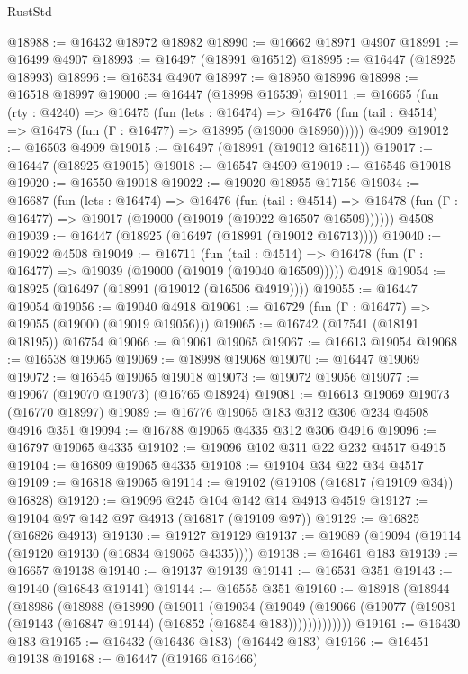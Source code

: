 \begin{lexlean}{RustStd}
\begin{coremodule}
{\begin{coremodule}
{{{{{{{{{{{{{{{{{{{{{{{{{{{{{{{{{{{{{{{{{{{{{{{{{{{{{{{@18988 := @16432 @18972 @18982
@18990 := @16662 @18971 @4907
@18991 := @16499 @4907
@18993 := @16497 (@18991 @16512)
@18995 := @16447 (@18925 @18993)
@18996 := @16534 @4907
@18997 := @18950 @18996
@18998 := @16518 @18997
@19000 := @16447 (@18998 @16539)
@19011 := @16665
    (fun (rty : @4240) =>
    @16475
      (fun (lets : @16474) =>
      @16476 (fun (tail : @4514) => @16478 (fun (Γ : @16477) => @18995 (@19000 @18960)))))
    @4909
@19012 := @16503 @4909
@19015 := @16497 (@18991 (@19012 @16511))
@19017 := @16447 (@18925 @19015)
@19018 := @16547 @4909
@19019 := @16546 @19018
@19020 := @16550 @19018
@19022 := @19020 @18955 @17156
@19034 := @16687
    (fun (lets : @16474) =>
    @16476
      (fun (tail : @4514) =>
      @16478 (fun (Γ : @16477) => @19017 (@19000 (@19019 (@19022 @16507 @16509))))))
    @4508
@19039 := @16447 (@18925 (@16497 (@18991 (@19012 @16713))))
@19040 := @19022 @4508
@19049 := @16711
    (fun (tail : @4514) => @16478 (fun (Γ : @16477) => @19039 (@19000 (@19019 (@19040 @16509)))))
    @4918
@19054 := @18925 (@16497 (@18991 (@19012 (@16506 @4919))))
@19055 := @16447 @19054
@19056 := @19040 @4918
@19061 := @16729 (fun (Γ : @16477) => @19055 (@19000 (@19019 @19056)))
@19065 := @16742 (@17541 (@18191 @18195)) @16754
@19066 := @19061 @19065
@19067 := @16613 @19054
@19068 := @16538 @19065
@19069 := @18998 @19068
@19070 := @16447 @19069
@19072 := @16545 @19065 @19018
@19073 := @19072 @19056
@19077 := @19067 (@19070 @19073) (@16765 @18924)
@19081 := @16613 @19069 @19073 (@16770 @18997)
@19089 := @16776 @19065 @183 @312 @306 @234 @4508 @4916 @351
@19094 := @16788 @19065 @4335 @312 @306 @4916
@19096 := @16797 @19065 @4335
@19102 := @19096 @102 @311 @22 @232 @4517 @4915
@19104 := @16809 @19065 @4335
@19108 := @19104 @34 @22 @34 @4517
@19109 := @16818 @19065
@19114 := @19102 (@19108 (@16817 (@19109 @34)) @16828)
@19120 := @19096 @245 @104 @142 @14 @4913 @4519
@19127 := @19104 @97 @142 @97 @4913 (@16817 (@19109 @97))
@19129 := @16825 (@16826 @4913)
@19130 := @19127 @19129
@19137 := @19089 (@19094 (@19114 (@19120 @19130 (@16834 @19065 @4335))))
@19138 := @16461 @183
@19139 := @16657 @19138
@19140 := @19137 @19139
@19141 := @16531 @351
@19143 := @19140 (@16843 @19141)
@19144 := @16555 @351
@19160 := @18918
    (@18944
      (@18986
        (@18988
          (@18990
            (@19011
              (@19034
                (@19049
                  (@19066 (@19077 (@19081 (@19143 (@16847 @19144) (@16852 (@16854 @183)))))))))))))
@19161 := @16430 @183
@19165 := @16432 (@16436 @183) (@16442 @183)
@19166 := @16451 @19138
@19168 := @16447 (@19166 @16466)
}}}}}}}}}}}}}}}}}}}}}}}}}}}}}}}}}}}}}}}}}}}}}}}}}}}}}}}
\end{coremodule}}
\end{coremodule}
\end{lexlean}
